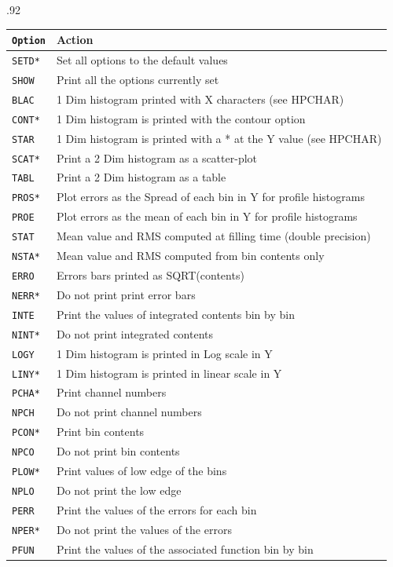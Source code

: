 \begin{table}
\begin{center}
\small\baselineskip.92\baselineskip
\begin{tabular}{|>{\tt}l|p{10cm}|}
\hline {\rm\bf Option}&{\bf Action}\\ \hline
SETD*&Set all options to the default values \\
SHOW &Print all the options currently set \\
BLAC &1 Dim histogram printed with X characters (see HPCHAR) \\
CONT*&1 Dim histogram is printed with the contour option \\
STAR &1 Dim histogram is printed with a * at the Y value (see HPCHAR) \\
SCAT*&Print a 2 Dim histogram as a scatter-plot \\
TABL &Print a 2 Dim histogram as a table \\
PROS*&Plot errors as the Spread of each bin in Y for profile histograms \\
PROE &Plot errors as the mean of each bin in Y for profile histograms \\
STAT &Mean value and RMS computed at filling time (double precision) \\
NSTA*&Mean value and RMS computed from bin contents only \\
ERRO &Errors bars printed as SQRT(contents) \\
NERR*&Do not print print error bars \\
INTE &Print the values of integrated contents bin by bin\\
NINT*&Do not print integrated contents \\
LOGY &1 Dim histogram is printed in Log scale in Y \\
LINY*&1 Dim histogram is printed in linear scale in Y \\
PCHA*&Print channel numbers \\
NPCH &Do not print channel numbers \\
PCON*&Print bin contents \\
NPCO &Do not print bin contents \\
PLOW*&Print values of low edge of the bins \\
NPLO &Do not print the low edge \\
PERR &Print the values of the errors for each bin \\
NPER*&Do not print the values of the errors \\
PFUN &Print the values of the associated function bin by bin \\

\end{tabular}
\end{center}
\end{table}
